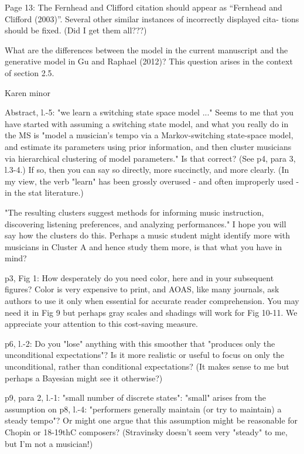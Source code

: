 Page 13: The Fernhead and Clifford citation should appear as “Fernhead and Clifford (2003)”. Several other similar instances of incorrectly displayed cita- tions should be fixed. (Did I get them all???)

What are the differences between the model in the current manuscript and the generative model in Gu and Raphael (2012)? This question arises in the context of section 2.5.


Karen minor

Abstract, l.-5: "we learn a switching state space model ..."
Seems to me that you have started with assuming a switching
state model, and what you really do in the MS is "model a
musician's tempo via a Markov-switching state-space model,
and estimate its parameters using prior information, and
then cluster musicians via hierarchical clustering of model
parameters." Is that correct? (See p4, para 3, l.3-4.) If 
so, then you can say so directly, more succinctly, and more 
clearly.  (In my view, the verb "learn" has been grossly 
overused - and often improperly used - in the stat literature.)

"The resulting clusters suggest methods for informing music 
instruction, discovering listening preferences, and analyzing 
performances."  I hope you will say how the clusters do this.
Perhaps a music student might identify more with musicians in
Cluster A and hence study them more, is that what you have in
mind?  

p3, Fig 1: How desperately do you need color, here and in your
subsequent figures? Color is very expensive to print, and AOAS,
like many journals, ask authors to use it only when essential
for accurate reader comprehension.  You may need it in Fig 9
but perhaps gray scales and shadings will work for Fig 10-11.
We appreciate your attention to this cost-saving measure.




p6, l.-2: Do you "lose" anything with this smoother that "produces only 
the unconditional expectations"?  Is it more realistic or useful to focus
on only the unconditional, rather than conditional expectations? (It makes
sense to me but perhaps a Bayesian might see it otherwise?)


p9, para 2, l.-1: "small number of discrete states":
"small" arises from the assumption on p8, l.-4: "performers generally
maintain (or try to maintain) a steady tempo"? Or might one argue that
this assumption might be reasonable for Chopin or 18-19thC composers?
(Stravinsky doesn't seem very "steady" to me, but I'm not a musician!)

